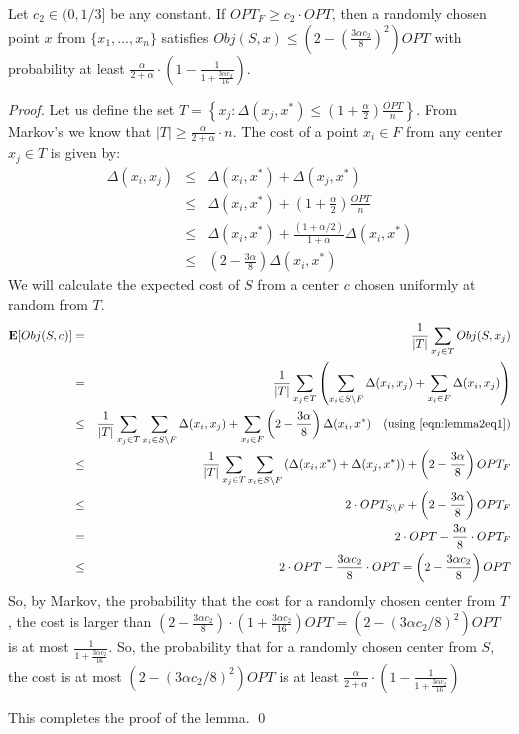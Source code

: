 \documentclass[11pt]{llncs}
\newcommand{\E}{\mathbf{E}}
\begin{document}
\begin{lemma}\label{lemma:2}
Let $c_2 \in (0, 1/3]$ be any constant.
If $OPT_{F} \geq c_2 \cdot OPT$, then a randomly chosen point $x$ from $\{x_1, ..., x_n\}$ satisfies $Obj(S, x) \leq \left(2 - \left(\frac{3\alpha c_2}{8}\right)^2 \right)OPT$ with probability at least $\frac{\alpha}{2 + \alpha} \cdot \left(1 - \frac{1}{1 + \frac{3\alpha c_2}{16}} \right)$.
\end{lemma}
\begin{proof}
Let us define the set $T = \left\{x_j : \Delta(x_j, x^*) \leq (1+\frac{\alpha}{2})\frac{OPT}{n}\right\}$.
From Markov's we know that $|T| \geq \frac{\alpha}{2+\alpha} \cdot n$. 
The cost of a point $x_i \in F$ from any center $x_j \in T$ is given by:
\begin{eqnarray}\label{eqn:lemma2eq1}
\Delta(x_i, x_j) &\leq& \Delta(x_i, x^*) + \Delta(x_j, x^*) \nonumber \\
&\leq& \Delta(x_i, x^*) + \left(1 + \frac{\alpha}{2} \right) \frac{OPT}{n} \nonumber \\
&\leq& \Delta(x_i, x^*) + \frac{(1+\alpha/2)}{1+\alpha} \Delta(x_i, x^*) \nonumber\\
&\leq& \left( 2-\frac{3\alpha}{8}\right)\Delta(x_i, x^*)
\end{eqnarray}
We will calculate the expected cost of $S$ from a center $c$ chosen uniformly at random from $T$.
\begin{eqnarray*}
\E[Obj(S, c)] &=& \frac{1}{|T|} \sum_{x_j \in T} Obj(S, x_j) \\
&=& \frac{1}{|T|} \sum_{x_j \in T}  \left( \sum_{x_i \in S\setminus F} \Delta(x_i, x_j) + \sum_{x_i \in F} \Delta(x_i, x_j)\right)\\
&\leq& \frac{1}{|T|} \sum_{x_j \in T} \sum_{x_i \in S\setminus F} \Delta(x_i, x_j) + \sum_{x_i \in F} \left(2 - \frac{3\alpha}{8}\right)\Delta(x_i, x^*) \quad \textrm{(using \ref{eqn:lemma2eq1})} \\
&\leq& \frac{1}{|T|} \sum_{x_j \in T} \sum_{x_i \in S\setminus F} \left( \Delta(x_i, x^*) + \Delta(x_j, x^*)\right) +  \left(2 - \frac{3\alpha}{8}\right)OPT_F\\
&\leq& 2 \cdot OPT_{S\setminus F} + \left(2 - \frac{3\alpha}{8}\right)OPT_F\\
&=& 2 \cdot OPT - \frac{3\alpha}{8} \cdot OPT_F\\
&\leq& 2 \cdot OPT - \frac{3\alpha c_2}{8} \cdot OPT = \left(2 - \frac{3\alpha c_2}{8} \right) OPT\\
\end{eqnarray*}
So, by Markov, the probability that the cost for a randomly chosen center from $T$, the cost is larger than $\left( 2 - \frac{3\alpha c_2}{8}\right) \cdot \left( 1 + \frac{3 \alpha c_2}{16}\right) OPT = \left( 2 - (3\alpha c_2/8)^2\right) OPT$ is at most $\frac{1}{1 + \frac{3\alpha c_2}{16}}$. 
So, the probability that for a randomly chosen center from $S$, the cost is at most $\left( 2 - (3\alpha c_2/8)^2\right) OPT$ is at least $\frac{\alpha}{2 + \alpha} \cdot \left(1 - \frac{1}{1 + \frac{3\alpha c_2}{16}} \right)$


This completes the proof of the lemma. \qed
\end{proof}
\end{document}

